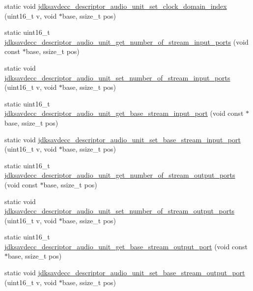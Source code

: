 \begin{DoxyCompactItemize}
\item 
static void \hyperlink{group__descriptor__audio_ga5cf215cfc1ba6a33e07ca772af5354dd}{jdksavdecc\+\_\+descriptor\+\_\+audio\+\_\+unit\+\_\+set\+\_\+clock\+\_\+domain\+\_\+index} (uint16\+\_\+t v, void $\ast$base, ssize\+\_\+t pos)
\item 
static uint16\+\_\+t \hyperlink{group__descriptor__audio_gadd8c4db853ace5bf571c73f102656e62}{jdksavdecc\+\_\+descriptor\+\_\+audio\+\_\+unit\+\_\+get\+\_\+number\+\_\+of\+\_\+stream\+\_\+input\+\_\+ports} (void const $\ast$base, ssize\+\_\+t pos)
\item 
static void \hyperlink{group__descriptor__audio_ga700f9764294f4e5ae874e4d57b1800f3}{jdksavdecc\+\_\+descriptor\+\_\+audio\+\_\+unit\+\_\+set\+\_\+number\+\_\+of\+\_\+stream\+\_\+input\+\_\+ports} (uint16\+\_\+t v, void $\ast$base, ssize\+\_\+t pos)
\item 
static uint16\+\_\+t \hyperlink{group__descriptor__audio_ga8d39d93a26faf1a376e88be7618f5f1d}{jdksavdecc\+\_\+descriptor\+\_\+audio\+\_\+unit\+\_\+get\+\_\+base\+\_\+stream\+\_\+input\+\_\+port} (void const $\ast$base, ssize\+\_\+t pos)
\item 
static void \hyperlink{group__descriptor__audio_ga1299bb147733b4ab4ec47dc6e5ba44fa}{jdksavdecc\+\_\+descriptor\+\_\+audio\+\_\+unit\+\_\+set\+\_\+base\+\_\+stream\+\_\+input\+\_\+port} (uint16\+\_\+t v, void $\ast$base, ssize\+\_\+t pos)
\item 
static uint16\+\_\+t \hyperlink{group__descriptor__audio_ga6d154b4647f125c6bf7cd483575ae7eb}{jdksavdecc\+\_\+descriptor\+\_\+audio\+\_\+unit\+\_\+get\+\_\+number\+\_\+of\+\_\+stream\+\_\+output\+\_\+ports} (void const $\ast$base, ssize\+\_\+t pos)
\item 
static void \hyperlink{group__descriptor__audio_gab1bce5de282622b7c299822b441e1c04}{jdksavdecc\+\_\+descriptor\+\_\+audio\+\_\+unit\+\_\+set\+\_\+number\+\_\+of\+\_\+stream\+\_\+output\+\_\+ports} (uint16\+\_\+t v, void $\ast$base, ssize\+\_\+t pos)
\item 
static uint16\+\_\+t \hyperlink{group__descriptor__audio_ga4f952ffca35b65123411eb3258c5cec9}{jdksavdecc\+\_\+descriptor\+\_\+audio\+\_\+unit\+\_\+get\+\_\+base\+\_\+stream\+\_\+output\+\_\+port} (void const $\ast$base, ssize\+\_\+t pos)
\item 
static void \hyperlink{group__descriptor__audio_ga3eec511458ece52356d75d158f239fab}{jdksavdecc\+\_\+descriptor\+\_\+audio\+\_\+unit\+\_\+set\+\_\+base\+\_\+stream\+\_\+output\+\_\+port} (uint16\+\_\+t v, void $\ast$base, ssize\+\_\+t pos)
\item 

\end{DoxyCompactItemize}
